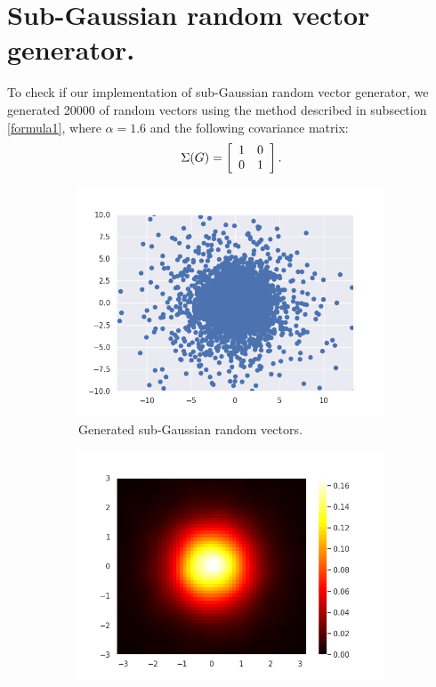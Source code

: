 \documentclass{article}
\begin{document}
	\section{Sub-Gaussian random vector generator.}\label{sec2}
	
	To check if our implementation of sub-Gaussian random vector generator, we generated 20000 of random vectors using the method described in subsection \ref{formula1}, where $\alpha = 1.6$ and the following covariance matrix:
	\begin{equation*}
		\Sigma(G) = \left[{\begin{array}{*{20}c}
			1 & 0\\
			0 & 1\end{array} } \right].
	\end{equation*}
	
	\begin{figure}[H]\label{dwa}
		\centering
		\begin{subfigure}{0.49\textwidth}
			\centering
			\includegraphics[width=\textwidth]{images/ex_2_alpha_stable_vector_simulation_sub_gaussian_SaS_catter}
			\caption{Generated sub-Gaussian random vectors.}\label{4}
		\end{subfigure}
		\hfill
		\begin{subfigure}{0.49\textwidth}
			\centering
			\includegraphics[width=\textwidth]{images/ex_2_alpha_stable_vector_simulation_sub_gaussian_SaS_heatmap}

\end{subfigure}
\end{figure}
\end{document}
